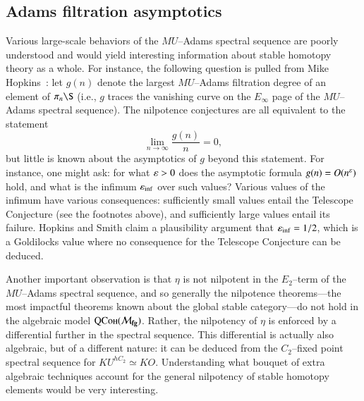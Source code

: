 \subsection*{Adams filtration asymptotics}

Various large-scale behaviors of the $MU$--Adams spectral sequence are poorly understood and would yield interesting information about stable homotopy theory as a whole.  For instance, the following question is pulled from Mike Hopkins~\cite[Section 10]{HopkinsOnRavenel}: let $g(n)$ denote the largest $MU$--Adams filtration degree of an element of $\pi_n \S$ (i.e., $g$ traces the vanishing curve on the $E_\infty$ page of the $MU$--Adams spectral sequence).  The nilpotence conjectures are all equivalent to the statement \[\lim_{n \to \infty} \frac{g(n)}{n} = 0,\] but little is known about the asymptotics of $g$ beyond this statement.  For instance, one might ask: for what $\varepsilon > 0$ does the asymptotic formula $g(n) = O(n^{\varepsilon})$ hold, and what is the infimum $\varepsilon_{\inf}$ over such values?  Various values of the infimum have various consequences: sufficiently small values entail the Telescope Conjecture (see the footnotes above), and sufficiently large values entail its failure.  Hopkins and Smith claim a plausibility argument that $\varepsilon_{\inf} = 1/2$, which is a Goldilocks value where no consequence for the Telescope Conjecture can be deduced.

Another important observation is that $\eta$ is not nilpotent in the $E_2$--term of the $MU$--Adams spectral sequence, and so generally the nilpotence theorems---the most impactful theorems known about the global stable category---do not hold in the algebraic model $\normalfont\textsc{QCoh}(\mathcal{M}_{\mathbf{fg}})$.  Rather, the nilpotency of $\eta$ is enforced by a differential further in the spectral sequence.  This differential is actually also algebraic, but of a different nature: it can be deduced from the $C_2$--fixed point spectral sequence for $KU^{hC_2} \simeq KO$.  Understanding what bouquet of extra algebraic techniques account for the general nilpotency of stable homotopy elements would be very interesting.

